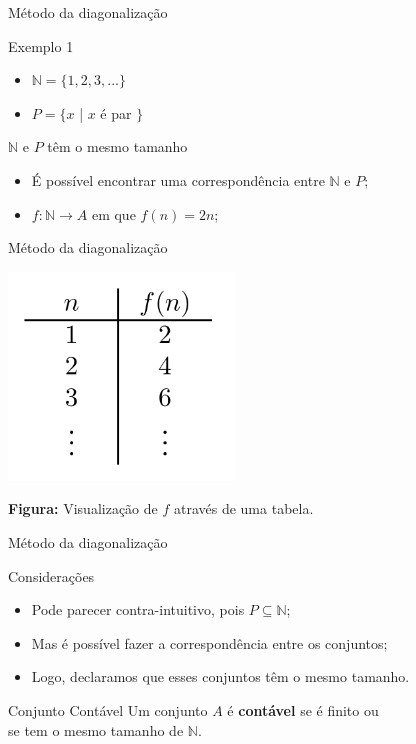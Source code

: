 \documentclass[xcolor=dvipsnames,table]{beamer}
\begin{document}
	\begin{frame}{Método da diagonalização}
		\begin{block}{Exemplo 1}
			\begin{itemize}
				\item $\mathbb{N} = \{ 1, 2, 3, ... \}$
				\item $P = \{ x$ | $x$ é par $\}$
			\end{itemize} 
		\end{block} \pause
		\begin{block}{$\mathbb{N}$ e $P$ têm o mesmo tamanho} \pause
			\begin{itemize}
				\item É possível encontrar uma correspondência entre $\mathbb{N}$ e $P$; \pause
				\item $f:\mathbb{N} \rightarrow A$ em que $f(n) = 2n$;
			\end{itemize}
		\end{block}	
	\end{frame}
	
	\begin{frame}{Método da diagonalização}
		\begin{center}
			\includegraphics[width=6cm]{images/fn2n.png}
			
			{\bf Figura:} Visualização de $f$ através de uma tabela.
		\end{center}
	\end{frame}
	
	\begin{frame}{Método da diagonalização}
		\begin{block}{Considerações}
			\begin{itemize}
				\item Pode parecer contra-intuitivo, pois $P \subseteq \mathbb{N}$; \pause
				\item Mas é possível fazer a correspondência entre os conjuntos; \pause
				\item Logo, declaramos que esses conjuntos têm o mesmo tamanho.			
			\end{itemize}
		\end{block} \pause
		\begin{block}{Conjunto Contável}
			Um conjunto $A$ é {\bf contável} se é finito ou \\se tem o mesmo tamanho de $\mathbb{N}$.
		\end{block}
	\end{frame}
	
\end{document}
